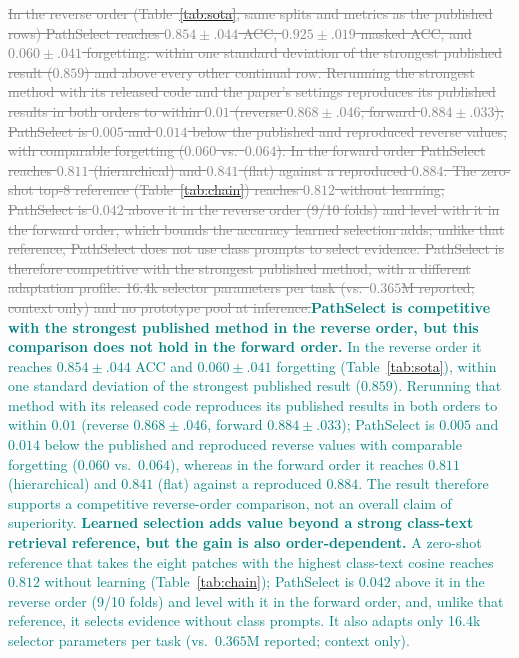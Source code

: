 \documentclass{article}
\newif\ifmarkup \markuptrue
\newcommand{\repc}[3]{\ifmarkup\textcolor{gray}{\sout{#2}}\textcolor{#1}{#3}\else#3\fi}
\newcommand{\repG}[2]{\repc{teal}{#1}{#2}}    %
\begin{document}
\repG{In the reverse order (Table~\ref{tab:sota}, same splits and metrics as the published rows) PathSelect reaches $0.854{\pm}.044$ ACC, $0.925{\pm}.019$ masked ACC, and $0.060{\pm}.041$ forgetting: within one standard deviation of the strongest published result ($0.859$) and above every other continual row. Rerunning the strongest method with its released code and the paper's settings reproduces its published results in both orders to within $0.01$ (reverse $0.868{\pm}.046$, forward $0.884{\pm}.033$); PathSelect is $0.005$ and $0.014$ below the published and reproduced reverse values, with comparable forgetting ($0.060$ vs.\ $0.064$). In the forward order PathSelect reaches $0.811$ (hierarchical) and $0.841$ (flat) against a reproduced $0.884$. The zero-shot top-8 reference (Table~\ref{tab:chain}) reaches $0.812$ without learning; PathSelect is $0.042$ above it in the reverse order (9/10 folds) and level with it in the forward order, which bounds the accuracy learned selection adds; unlike that reference, PathSelect does not use class prompts to select evidence. PathSelect is therefore competitive with the strongest published method, with a different adaptation profile: 16.4k selector parameters per task (vs.\ $0.365$M reported; context only) and no prototype pool at inference.}{\textbf{PathSelect is competitive with the strongest published method in the reverse order, but this comparison does not hold in the forward order.} In the reverse order it reaches $0.854{\pm}.044$ ACC and $0.060{\pm}.041$ forgetting (Table~\ref{tab:sota}), within one standard deviation of the strongest published result ($0.859$). Rerunning that method with its released code reproduces its published results in both orders to within $0.01$ (reverse $0.868{\pm}.046$, forward $0.884{\pm}.033$); PathSelect is $0.005$ and $0.014$ below the published and reproduced reverse values with comparable forgetting ($0.060$ vs.\ $0.064$), whereas in the forward order it reaches $0.811$ (hierarchical) and $0.841$ (flat) against a reproduced $0.884$. The result therefore supports a competitive reverse-order comparison, not an overall claim of superiority. \textbf{Learned selection adds value beyond a strong class-text retrieval reference, but the gain is also order-dependent.} A zero-shot reference that takes the eight patches with the highest class-text cosine reaches $0.812$ without learning (Table~\ref{tab:chain}); PathSelect is $0.042$ above it in the reverse order (9/10 folds) and level with it in the forward order, and, unlike that reference, it selects evidence without class prompts. It also adapts only 16.4k selector parameters per task (vs.\ $0.365$M reported; context only).}
\end{document}
